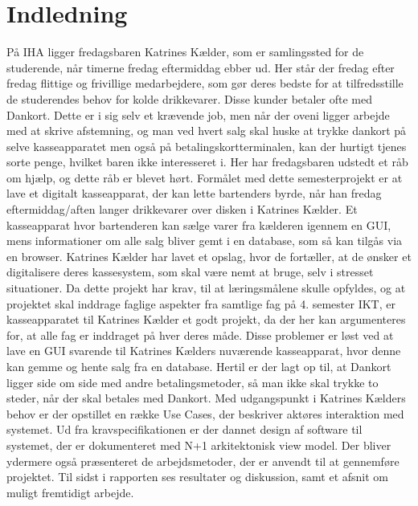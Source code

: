 \chapter{Indledning}
På \gls{IHA} ligger fredagsbaren Katrines Kælder, som er samlingssted for de studerende, når timerne 
fredag eftermiddag ebber ud. Her står der fredag efter fredag flittige og frivillige medarbejdere, som gør deres bedste for at 
tilfredsstille de studerendes behov for kolde drikkevarer. Disse kunder betaler ofte med Dankort. Dette er i sig selv et krævende job, men når der oveni ligger arbejde
med at skrive afstemning, og man ved hvert salg skal huske at trykke dankort på selve kasseapparatet men også på betalingskortterminalen, kan der hurtigt tjenes sorte penge, hvilket baren ikke interesseret i. 
Her har fredagsbaren udstedt et råb om hjælp, og dette råb er blevet hørt. 
\newline
\newline
Formålet med dette semesterprojekt er at lave et digitalt kasseapparat, der kan lette bartenders byrde, når han fredag eftermiddag/aften langer drikkevarer over disken i Katrines Kælder. Et kasseapparat hvor bartenderen kan sælge varer fra kælderen igennem en GUI, mens informationer om alle salg bliver gemt i en database, som så kan tilgås via en browser.
\newline
\newline
Katrines Kælder har lavet et opslag, hvor de fortæller, at de ønsker et digitalisere deres kassesystem, som skal være nemt at bruge, selv i stresset situationer. Da dette projekt har krav, til at læringsmålene skulle opfyldes, og at projektet skal inddrage faglige aspekter fra samtlige fag på 4. semester IKT, er kasseapparatet til Katrines Kælder et godt projekt, da der her kan argumenteres for, at alle fag er inddraget på hver deres måde.
\newline
\newline
Disse problemer er løst ved at lave en GUI svarende til Katrines Kælders nuværende kasseapparat, hvor denne kan gemme og hente salg fra en database. Hertil er der lagt op til, at Dankort ligger side om side med andre betalingsmetoder, så man ikke skal trykke to steder, når der skal betales med Dankort. 
\newline
\newline
Med udgangspunkt i Katrines Kælders behov er der opstillet en række Use Cases, der beskriver aktøres interaktion med systemet. Ud fra kravspecifikationen er der dannet design af software til systemet, der er dokumenteret med N+1 arkitektonisk view model. Der bliver ydermere også præsenteret de arbejdsmetoder, der er anvendt til at gennemføre projektet. Til sidst i rapporten ses resultater og diskussion, samt et afsnit om muligt fremtidigt arbejde.